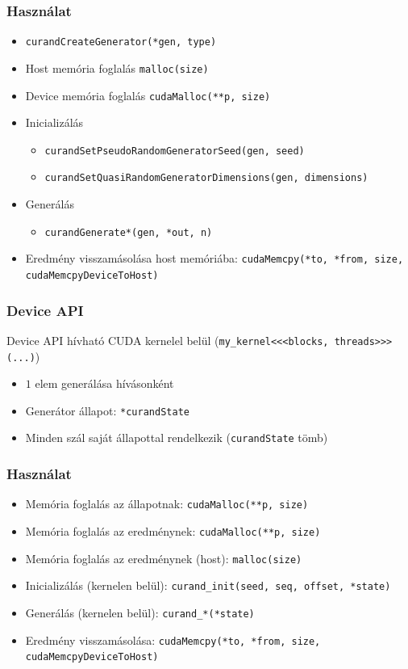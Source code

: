 \documentclass[xetex]{beamer}
\begin{document}
  \begin{frame}
    \frametitle{Használat}
    \begin{itemize}
      \item \texttt{curandCreateGenerator(*gen, type)}
      \item Host memória foglalás \texttt{malloc(size)}
      \item Device memória foglalás \texttt{cudaMalloc(**p, size)}
      \item Inicializálás
        \begin{itemize}
          \item \texttt{curandSetPseudoRandomGeneratorSeed(gen, seed)}
          \item \texttt{curandSetQuasiRandomGeneratorDimensions(gen, dimensions)}
        \end{itemize}
      \item Generálás
      \begin{itemize}
        \item \texttt{curandGenerate*(gen, *out, n)}
      \end{itemize}
      \item Eredmény visszamásolása host memóriába: \texttt{cudaMemcpy(*to, *from, size, cudaMemcpyDeviceToHost)}
    \end{itemize}
  \end{frame}
  \begin{frame}
    \frametitle{Device API}
    Device API hívható CUDA kernelel belül (\texttt{my\_kernel<<<blocks, threads>>>(...)})
    \begin{itemize}
      \item $1$ elem generálása hívásonként
      \item Generátor állapot: \texttt{*curandState}
      \item Minden szál saját állapottal rendelkezik (\texttt{curandState} tömb)
    \end{itemize}
  \end{frame}
  \begin{frame}
    \frametitle{Használat}
    \begin{itemize}
      \item Memória foglalás az állapotnak: \texttt{cudaMalloc(**p, size)}
      \item Memória foglalás az eredménynek: \texttt{cudaMalloc(**p, size)}
      \item Memória foglalás az eredménynek (host): \texttt{malloc(size)}
      \item Inicializálás (kernelen belül): \texttt{curand\_init(seed, seq, offset, *state)}
      \item Generálás (kernelen belül): \texttt{curand\_*(*state)}
      \item Eredmény visszamásolása: \texttt{cudaMemcpy(*to, *from, size, cudaMemcpyDeviceToHost)}
    \end{itemize}
  \end{frame}
\end{document}
